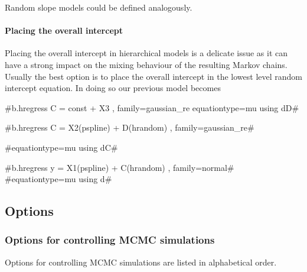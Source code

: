 Random slope models could be defined analogously.

\paragraph{Placing the overall intercept}

$ $ \\

Placing the overall intercept in hierarchical models is a delicate issue as it can have a strong impact on the
mixing behaviour of the resulting Markov chains.
Usually the best option is to place the overall intercept in the lowest level random intercept equation. In doing so our
previous model becomes

#b.hregress C = const + X3   , family=gaussian_re equationtype=mu using dD#

#b.hregress C = X2(pspline) + D(hrandom)  , family=gaussian_re#

#equationtype=mu using dC#

#b.hregress y = X1(pspline)  + C(hrandom) , family=normal#
#equationtype=mu using d#



\subsection{Options}
\label{mcmcregregressoptions}

\vspace{0.4cm}

\subsubsection*{Options for controlling MCMC simulations}
\label{mcmc_options}

Options for controlling MCMC simulations are listed in
alphabetical order.

